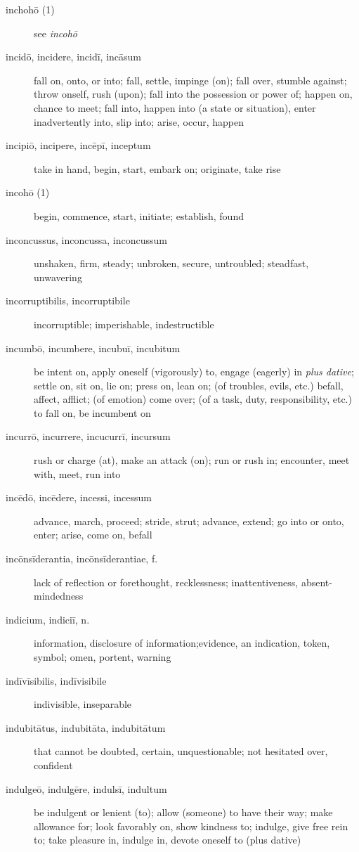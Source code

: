 \begin{description}
    \item[inchohō (1)] see \textit{incohō}
    \item[incidō, incidere, incidī, incāsum] \marginnote{*}fall on, onto, or into; fall, settle, impinge (on); fall over, stumble against; throw onself, rush (upon); fall into the possession or power of; happen on, chance to meet; fall into, happen into (a state or situation), enter inadvertently into, slip into; arise, occur, happen
    \item[incipiō, incipere, incēpī, inceptum] \marginnote{*}take in hand, begin, start, embark on; originate, take rise
    \item[incohō (1)] begin, commence, start, initiate; establish, found
    \item[inconcussus, inconcussa, inconcussum] unshaken, firm, steady; unbroken, secure, untroubled; steadfast, unwavering
    \item[incorruptibilis, incorruptibile] incorruptible; imperishable, indestructible
    \item[incumbō, incumbere, incubuī, incubitum] be intent on, apply oneself (vigorously) to, engage (eagerly) in \textit{plus dative}; settle on, sit on, lie on; press on, lean on; (of troubles, evils, etc.) befall, affect, afflict; (of emotion) come over; (of a task, duty, responsibility, etc.) to fall on, be incumbent on
    \item[incurrō, incurrere, incucurrī, incursum] rush or charge (at), make an attack (on); run or rush in; encounter, meet with, meet, run into
    \item[incēdō, incēdere, incessi, incessum] advance, march, proceed; stride, strut; advance, extend; go into or onto, enter; arise, come on, befall
    \item[incōnsīderantia, incōnsīderantiae, f.] lack of reflection or forethought, recklessness; inattentiveness, absent-mindedness
    \item[indicium, indiciī, n.] information, disclosure of information;evidence, an indication, token, symbol; omen, portent, warning
    \item[indīvīsibilis, indīvisibile] indivisible, inseparable
    \item[indubitātus, indubitāta, indubitātum] that cannot be doubted, certain, unquestionable; not hesitated over, confident
    \item[indulgeō, indulgēre, indulsī, indultum] be indulgent or lenient (to); allow (someone) to have their way; make allowance for; look favorably on, show kindness to; indulge, give free rein to; take pleasure in, indulge in, devote oneself to (plus dative)

\end{description}
